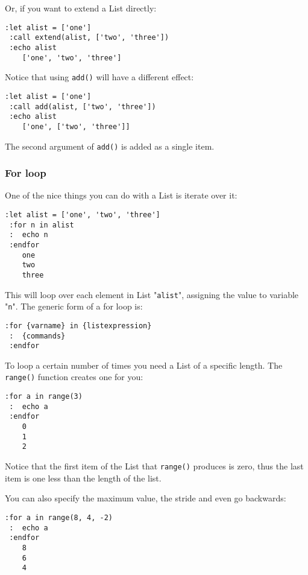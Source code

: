 Or, if you want to extend a List directly:

\begin{Verbatim}[samepage=true]
 :let alist = ['one']
 :call extend(alist, ['two', 'three'])
 :echo alist
    ['one', 'two', 'three']
\end{Verbatim}

Notice that using \texttt{add()} will have a different effect:

\begin{Verbatim}[samepage=true]
 :let alist = ['one']
 :call add(alist, ['two', 'three'])
 :echo alist
    ['one', ['two', 'three']]
\end{Verbatim}

The second argument of \texttt{add()} is added as a single item.
\subsubsection{For loop}
One of the nice things you can do with a List is iterate over it:

\begin{Verbatim}[samepage=true]
 :let alist = ['one', 'two', 'three']
 :for n in alist
 :  echo n
 :endfor
    one
    two
    three
\end{Verbatim}

This will loop over each element in List "\texttt{alist}", assigning the value to variable "\texttt{n}".
The generic form of a for loop is:

\begin{Verbatim}[samepage=true]
 :for {varname} in {listexpression}
 :  {commands}
 :endfor
\end{Verbatim}

To loop a certain number of times you need a List of a specific length.
The \texttt{range()} function creates one for you:

\begin{Verbatim}[samepage=true]
 :for a in range(3)
 :  echo a
 :endfor
    0
    1
    2
\end{Verbatim}

Notice that the first item of the List that \texttt{range()} produces is zero, thus the last item is one less than the length of the list.

You can also specify the maximum value, the stride and even go backwards:

\begin{Verbatim}[samepage=true]
 :for a in range(8, 4, -2)
 :  echo a
 :endfor
    8
    6
    4
\end{Verbatim}

